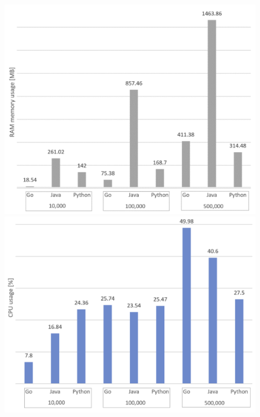 \begin{figure}[H]
	\centering
	\includegraphics[height=0.3\textheight]{./part/Proyecto_ejecutivo/memoria_constructiva/golang/img/memory_usage}
	\includegraphics[height=0.3\textheight]{./part/Proyecto_ejecutivo/memoria_constructiva/golang/img/cpuUsage}

\end{figure}
